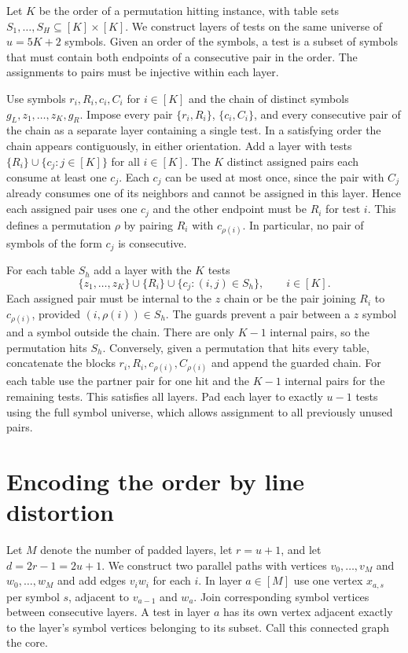 \documentclass[11pt]{article}
\begin{document}
Let $K$ be the order of a permutation hitting instance, with table sets $S_1,\ldots,S_H\subseteq[K]\times[K]$. We construct layers of tests on the same universe of $u=5K+2$ symbols. Given an order of the symbols, a test is a subset of symbols that must contain both endpoints of a consecutive pair in the order. The assignments to pairs must be injective within each layer.

Use symbols $r_i,R_i,c_i,C_i$ for $i\in[K]$ and the chain of distinct symbols $g_L,z_1,\ldots,z_K,g_R$. Impose every pair $\{r_i,R_i\}$, $\{c_i,C_i\}$, and every consecutive pair of the chain as a separate layer containing a single test. In a satisfying order the chain appears contiguously, in either orientation. Add a layer with tests $\{R_i\}\cup\{c_j:j\in[K]\}$ for all $i\in[K]$. The $K$ distinct assigned pairs each consume at least one $c_j$. Each $c_j$ can be used at most once, since the pair with $C_j$ already consumes one of its neighbors and cannot be assigned in this layer. Hence each assigned pair uses one $c_j$ and the other endpoint must be $R_i$ for test $i$. This defines a permutation $\rho$ by pairing $R_i$ with $c_{\rho(i)}$. In particular, no pair of symbols of the form $c_j$ is consecutive.

For each table $S_h$ add a layer with the $K$ tests
\[
 \{z_1,\ldots,z_K\}\cup\{R_i\}\cup\{c_j:(i,j)\in S_h\},
 \qquad i\in[K].
\]
Each assigned pair must be internal to the $z$ chain or be the pair joining $R_i$ to $c_{\rho(i)}$, provided $(i,\rho(i))\in S_h$. The guards prevent a pair between a $z$ symbol and a symbol outside the chain. There are only $K-1$ internal pairs, so the permutation hits $S_h$. Conversely, given a permutation that hits every table, concatenate the blocks $r_i,R_i,c_{\rho(i)},C_{\rho(i)}$ and append the guarded chain. For each table use the partner pair for one hit and the $K-1$ internal pairs for the remaining tests. This satisfies all layers. Pad each layer to exactly $u-1$ tests using the full symbol universe, which allows assignment to all previously unused pairs.

\section{Encoding the order by line distortion}

Let $M$ denote the number of padded layers, let $r=u+1$, and let $d=2r-1=2u+1$. We construct two parallel paths with vertices $v_0,\ldots,v_M$ and $w_0,\ldots,w_M$ and add edges $v_iw_i$ for each $i$. In layer $a\in[M]$ use one vertex $x_{a,s}$ per symbol $s$, adjacent to $v_{a-1}$ and $w_a$. Join corresponding symbol vertices between consecutive layers. A test in layer $a$ has its own vertex adjacent exactly to the layer's symbol vertices belonging to its subset. Call this connected graph the core.
\end{document}
